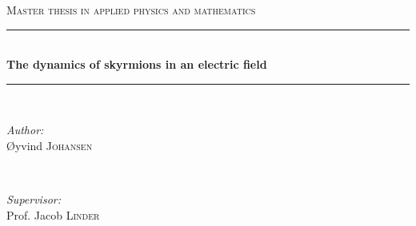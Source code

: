 \documentclass[12pt, a4paper, twoside, openright]{report}
\numberwithin{equation}{chapter}
\numberwithin{figure}{chapter}
\numberwithin{table}{chapter}
\begin{document}
\begin{titlepage}

\newcommand{\HRule}{\rule{\linewidth}{0.5mm}} %

\center %
 

\textsc{\Large Master thesis in applied physics and mathematics}\\[0.5cm] %


\HRule \\[0.4cm]
{ \huge \bfseries The dynamics of skyrmions in an electric field}\\[0.4cm] %
\HRule \\[1.5cm]
 

\begin{minipage}{0.4\textwidth}
\begin{flushleft} \large
\emph{Author:}\\
\O yvind \textsc{Johansen} %
\end{flushleft}
\end{minipage}
~
\begin{minipage}{0.4\textwidth}
\begin{flushright} \large
\emph{Supervisor:} \\
Prof. Jacob \textsc{Linder} %
\end{flushright}
\end{minipage}\\[4cm]


\end{titlepage}
\end{document}
